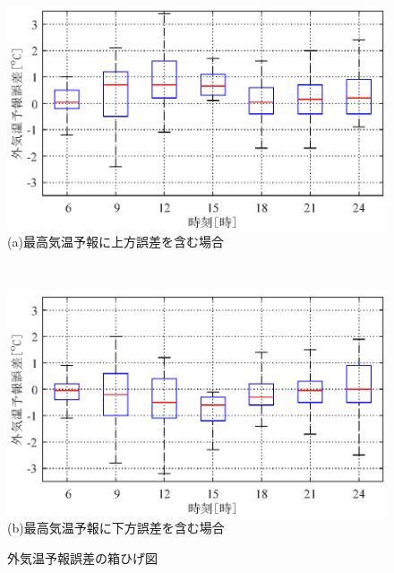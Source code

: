 \begin{figure}[htbp]
    \begin{center}
        \begin{minipage}{0.7\textwidth}
            \begin{center}
                \includegraphics[width=1\textwidth,keepaspectratio=true]{fig/robust_boxplot_upward.eps}\\{\small (a)最高気温予報に上方誤差を含む場合}
            \end{center}
        \end{minipage}
        \\
        \begin{minipage}{0.7\textwidth}
            \begin{center}
                \includegraphics[width=1\textwidth,keepaspectratio=true]{fig/robust_boxplot_downward.eps}\\{\small (b)最高気温予報に下方誤差を含む場合}
            \end{center}
        \end{minipage}
        \vspace{-1mm}
        \caption{外気温予報誤差の箱ひげ図}
        \label{fig::robust_boxplot}
    \end{center}
\end{figure}

